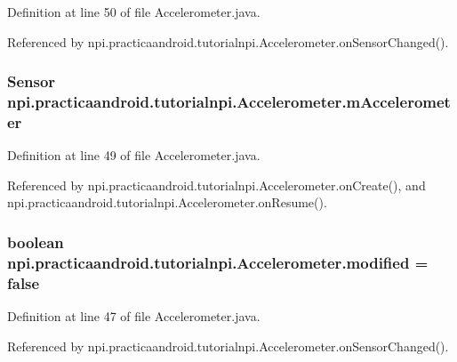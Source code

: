 Definition at line 50 of file Accelerometer.\-java.



Referenced by npi.\-practicaandroid.\-tutorialnpi.\-Accelerometer.\-on\-Sensor\-Changed().

\hypertarget{classnpi_1_1practicaandroid_1_1tutorialnpi_1_1_accelerometer_ae5d3a5141d3abe2026f24f948b6a220a}{
\subsubsection[{m\-Accelerometer}]{\setlength{\rightskip}{0pt plus 5cm}Sensor npi.\-practicaandroid.\-tutorialnpi.\-Accelerometer.\-m\-Accelerometer\hspace{0.3cm}{\ttfamily [private]}}}\label{classnpi_1_1practicaandroid_1_1tutorialnpi_1_1_accelerometer_ae5d3a5141d3abe2026f24f948b6a220a}


Definition at line 49 of file Accelerometer.\-java.



Referenced by npi.\-practicaandroid.\-tutorialnpi.\-Accelerometer.\-on\-Create(), and npi.\-practicaandroid.\-tutorialnpi.\-Accelerometer.\-on\-Resume().

\hypertarget{classnpi_1_1practicaandroid_1_1tutorialnpi_1_1_accelerometer_a525132490dab752030175fe7bf6fd4c4}{
\subsubsection[{modified}]{\setlength{\rightskip}{0pt plus 5cm}boolean npi.\-practicaandroid.\-tutorialnpi.\-Accelerometer.\-modified = false\hspace{0.3cm}{\ttfamily [private]}}}\label{classnpi_1_1practicaandroid_1_1tutorialnpi_1_1_accelerometer_a525132490dab752030175fe7bf6fd4c4}


Definition at line 47 of file Accelerometer.\-java.



Referenced by npi.\-practicaandroid.\-tutorialnpi.\-Accelerometer.\-on\-Sensor\-Changed().

